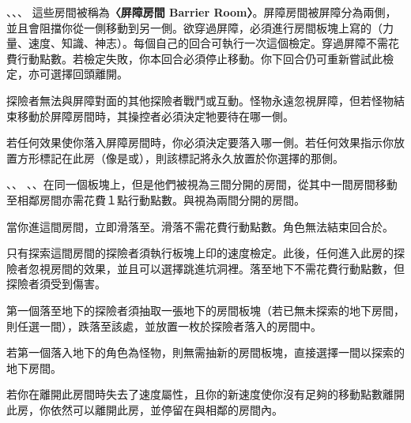 \begin{RuleBox}{、、、}
  這些房間被稱為\textbf{〈屏障房間 Barrier Room〉}。屏障房間被屏障分為兩側，並且會阻擋你從一側移動到另一側。欲穿過屏障，必須進行房間板塊上寫的\textbf{}（力量、速度、知識、神志）。每個自己的回合可執行一次這個檢定。穿過屏障不需花費行動點數。若檢定失敗，你本回合必須停止移動。你下回合仍可重新嘗試此檢定，亦可選擇回頭離開。

  探險者無法與屏障對面的其他探險者戰鬥或互動。怪物永遠忽視屏障，但若怪物結束移動於屏障房間時，其操控者必須決定牠要待在哪一側。

  若任何效果使你落入屏障房間時，你必須決定要落入哪一側。若任何效果指示你放置方形標記在此房（像是或），則該標記將永久放置於你選擇的那側。
\end{RuleBox}

\begin{RuleBox}{、、}
  、、在同一個板塊上，但是他們被視為三間分開的房間，從其中一間房間移動至相鄰房間亦需花費１點行動點數。與視為兩間分開的房間。
\end{RuleBox}

\begin{RuleBox}{}
  當你進這間房間，立即滑落至。滑落不需花費行動點數。角色無法結束回合於。
\end{RuleBox}

\begin{RuleBox}{}
  只有探索這間房間的探險者須執行板塊上印的速度檢定。此後，任何進入此房的探險者忽視房間的效果，並且可以選擇跳進坑洞裡。落至地下不需花費行動點數，但探險者須受到傷害。

  第一個落至地下的探險者須抽取一張地下的房間板塊（若已無未探索的地下房間，則任選一間），跌落至該處，並放置一枚於探險者落入的房間中。

  若第一個落入地下的角色為怪物，則無需抽新的房間板塊，直接選擇一間以探索的地下房間。
\end{RuleBox}

\begin{RuleBox}{}
  若你在離開此房間時失去了速度屬性，且你的新速度使你沒有足夠的移動點數離開此房，你依然可以離開此房，並停留在與相鄰的房間內。
\end{RuleBox}

